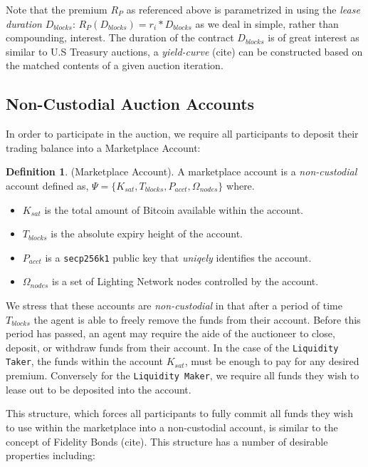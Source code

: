 \documentclass[10pt,a4paper]{article}
\theoremstyle{definition}
\newtheorem{definition}{Definition}[section]
\begin{document}
Note that the premium $R_{P}$ as referenced above is parametrized in using the
\emph{lease duration} $D_{blocks}$: $R_{P}(D_{blocks}) = r_i * D_{blocks}$ as
we deal in simple, rather than compounding, interest.  The duration of the
contract $D_{blocks}$ is of great interest as similar to U.S Treasury auctions,
a \emph{yield-curve} (cite) can be constructed based on the matched contents of
a given auction iteration. %


\subsection{Non-Custodial Auction Accounts}

In order to participate in the auction, we require all participants to deposit their
trading balance into a Marketplace Account:

\theoremstyle{definition}
\begin{definition}{(Marketplace Account).}
A marketplace account is a \emph{non-custodial} account defined as, $\Psi =
\{K_{sat}, T_{blocks}, P_{acct}, \Omega_{nodes} \}$ where.
\end{definition}

\begin{itemize}
    \item $K_{sat}$ is the total amount of Bitcoin available within the account.
    \item $T_{blocks}$ is the absolute expiry height of the account. 
    \item $P_{acct}$ is a \texttt{secp256k1} public key  that \emph{uniqely} identifies the account.
    \item $\Omega_{nodes}$ is a set of Lighting Network nodes controlled by the account.
\end{itemize}

We stress that these accounts are \emph{non-custodial} in that after a period
of time $T_{blocks}$ the agent is able to freely remove the funds from their
account. Before this period has passed, an agent may require the aide of the
auctioneer to close, deposit, or withdraw funds from their account. In the case
of the \texttt{Liquidity Taker}, the funds within the account $K_{sat}$, must
be enough to pay for any desired premium. Conversely for the \texttt{Liquidity
Maker}, we require all funds they wish to lease out to be deposited into the
account. 

This structure, which forces all participants to fully commit all funds they
wish to use within the marketplace into a non-custodial account, is similar to
the concept of Fidelity Bonds (cite). This structure has a number of desirable
properties including:
\end{document}
